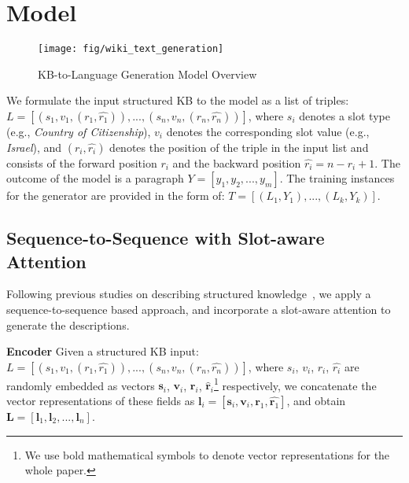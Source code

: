 \documentclass[11pt,a4paper]{article}
\begin{document}
 \section{Model}







\begin{figure*}[!htb]
\centering\small
\texttt{[image: fig/wiki\_text\_generation]}
\caption{KB-to-Language Generation Model Overview}
\label{fig:overview}
\vspace{-2mm}
\end{figure*}












We formulate the input structured KB to the model as a list of triples: 
$L=[(s_1, v_1, (r_1, \hat{r_1})), ..., (s_n, v_n, (r_n, \hat{r_n}))]$, where 
$s_i$ denotes a slot type (e.g., \emph{Country of Citizenship}), $v_i$ denotes the corresponding slot value (e.g., \emph{Israel}), and $(r_i, \hat{r_i})$ denotes the position of the triple in the input list
and consists of the forward position $r_{i}$ and the backward position $\hat{r_{i}}=n-r_{i}+1$. The outcome of the model is a paragraph $Y=[y_1, y_2, ..., y_m]$.
The training instances for the generator are provided in the form of: $T=[(L_1, Y_1), 
..., (L_k, Y_k)]$. 






\subsection{Sequence-to-Sequence with Slot-aware Attention}
\label{sec:slot-att}
Following previous studies on describing structured knowledge~\cite{biogen16,sha2017order,table2text17}, we apply a sequence-to-sequence based approach, and incorporate a slot-aware attention to generate the descriptions.

\textbf{Encoder} Given a structured KB input: $L=[(s_1, v_1, (r_1, \hat{r_1})), ..., (s_n, v_n, (r_n, \hat{r_n}))]$, where $s_i$, $v_i$, $r_i$, $\hat{r_i}$ are randomly embedded as vectors $\textbf{s}_i$, $\textbf{v}_i$, $\textbf{r}_i$, $\hat{\textbf{r}}_i$\footnote{We use bold mathematical symbols to denote vector representations for the whole paper.} respectively, we concatenate the vector representations of these fields as $\textbf{l}_i=[\textbf{s}_i, \textbf{v}_i, \textbf{r}_1, \hat{\textbf{r}_1}]$, and obtain $\textbf{L}=[\textbf{l}_1, \textbf{l}_2, ..., \textbf{l}_n]$.
\end{document}
